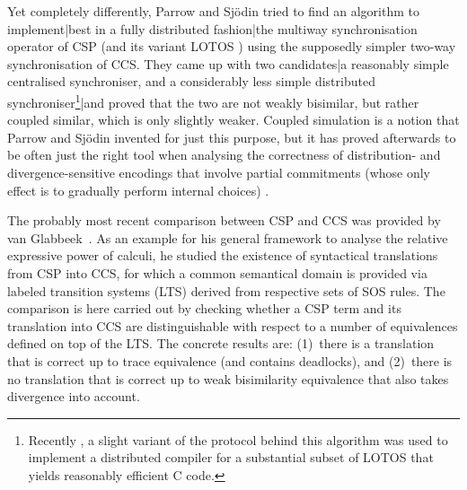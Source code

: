\documentclass[]{eptcs}
\begin{document}
Yet completely differently, Parrow and Sj{\"o}din \cite{sjodin:phd,parrowCoupled92} tried to find an algorithm to implement|best in a fully distributed fashion|the multiway synchronisation operator of CSP (and its variant LOTOS \cite{DBLP:conf/pstv/Brinksma85}) using the supposedly simpler two-way synchronisation of CCS. They came up with two candidates|a reasonably simple centralised synchroniser, and a considerably less simple distributed synchroniser\footnote{Recently \cite{7092761}, a slight variant of the protocol behind this algorithm was used to implement a distributed compiler for a substantial subset of LOTOS that yields reasonably efficient C code.}|and proved that the two are not weakly bisimilar, but rather coupled similar, which is only slightly weaker. Coupled simulation is a notion that Parrow and Sj\"odin invented for just this purpose, but it has proved afterwards to be often just the right tool when analysing the correctness of distribution- and divergence-sensitive encodings that involve partial commitments (whose only effect is to gradually perform internal choices) \cite{nestmannPierce00}.

The probably most recent comparison between CSP and CCS was provided by van Glabbeek~\cite{DBLP:journals/corr/abs-1208-2750}. As an example for his general framework to analyse the relative expressive power of calculi, he studied the existence of syntactical translations from CSP into CCS, for which a common semantical domain is provided via labeled transition systems (LTS) derived from respective sets of SOS rules. The comparison is here carried out by checking whether a CSP term and its translation into CCS are distinguishable with respect to a number of equivalences defined on top of the LTS. The concrete results are: (1)~there is a translation that is correct up to trace equivalence (and contains deadlocks), and (2)~there is no translation that is correct up to weak bisimilarity equivalence that also takes divergence into account.
\end{document}
